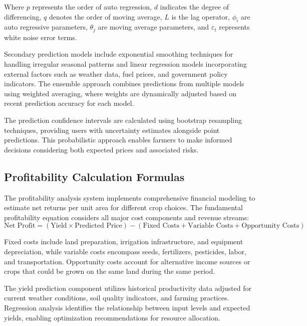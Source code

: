 Where $p$ represents the order of auto regression, $d$ indicates the degree of differencing, $q$ denotes the order of moving average, $L$ is the lag operator, $\phi_i$ are auto regressive parameters, $\theta_j$ are moving average parameters, and $\varepsilon_t$ represents white noise error terms.

Secondary prediction models include exponential smoothing techniques for handling irregular seasonal patterns and linear regression models incorporating external factors such as weather data, fuel prices, and government policy indicators. The ensemble approach combines predictions from multiple models using weighted averaging, where weights are dynamically adjusted based on recent prediction accuracy for each model.

The prediction confidence intervals are calculated using bootstrap resampling techniques, providing users with uncertainty estimates alongside point predictions. This probabilistic approach enables farmers to make informed decisions considering both expected prices and associated risks.

\subsection{Profitability Calculation Formulas}

The profitability analysis system implements comprehensive financial modeling to estimate net returns per unit area for different crop choices. The fundamental profitability equation considers all major cost components and revenue streams:
\begin{equation}
\text{Net Profit} = (\text{Yield} \times \text{Predicted Price}) - (\text{Fixed Costs} + \text{Variable Costs} + \text{Opportunity Costs})
\end{equation}

Fixed costs include land preparation, irrigation infrastructure, and equipment depreciation, while variable costs encompass seeds, fertilizers, pesticides, labor, and transportation. Opportunity costs account for alternative income sources or crops that could be grown on the same land during the same period.

The yield prediction component utilizes historical productivity data adjusted for current weather conditions, soil quality indicators, and farming practices. Regression analysis identifies the relationship between input levels and expected yields, enabling optimization recommendations for resource allocation.

